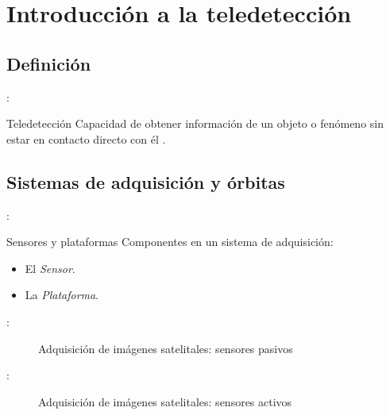 \section{Introducción a la teledetección}

\subsection{Definición}
\begin{frame}{\secname : \subsecname}
\begin{block}{Teledetección}
 Capacidad de obtener información de un objeto o fenómeno sin estar en contacto directo con él .
\end{block}

\end{frame}

\subsection{Sistemas de adquisición y órbitas}

\begin{frame}{\secname : \subsecname}

\begin{block}{Sensores y plataformas}
  Componentes en un sistema de adquisición:
  \begin{itemize}
    \item El \emph{Sensor}.
    \item La \emph{Plataforma}.
  \end{itemize}
\end{block}

\end{frame}



\begin{frame}{\secname : \subsecname}
  \begin{figure}
    \centering
    \caption{Adquisición de imágenes satelitales: sensores pasivos}
    \label{}
  \end{figure}
\end{frame}

\begin{frame}{\secname : \subsecname}
  \begin{figure}
    \centering
    \caption{Adquisición de imágenes satelitales: sensores activos}
    \label{}
  \end{figure}
\end{frame}


